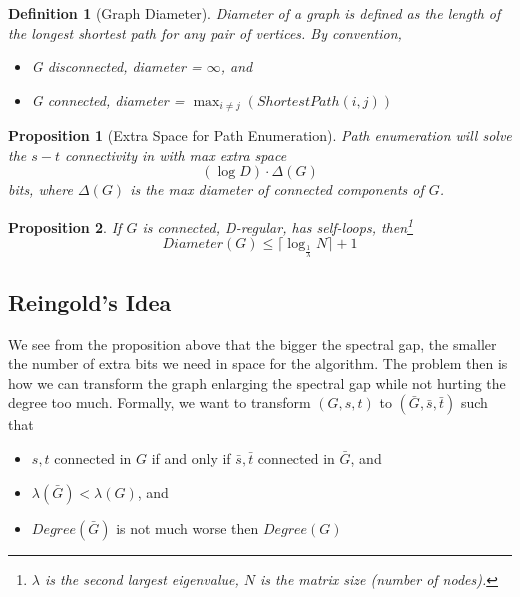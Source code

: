 \documentclass[11pt, letter]{book}
\newtheorem{proposition}{Proposition}[chapter]
\newtheorem{definition}{Definition}[chapter]
\begin{document}
\begin{definition}[Graph Diameter]
	Diameter of a graph is defined as the length of the longest shortest path for any pair of vertices. By convention, 
	\begin{itemize}
		\item G disconnected, diameter = $\infty$, and
		\item G connected, diameter = $\max_{i \neq j} \left( ShortestPath (i, j) \right)$
	\end{itemize}
\end{definition}

\begin{mdframed}
	\begin{proposition}[Extra Space for Path Enumeration]
		Path enumeration will solve the $s-t$ connectivity in with max extra space 
		\begin{equation}
			(\log D) \cdot \Delta (G) \label{eq:path_enumeration_extra_space}
		\end{equation} 
		bits, where $\Delta (G)$ is the max diameter of connected components of $G$. 
	\end{proposition}
\end{mdframed}

\begin{proposition}
	If $G$ is connected, D-regular, has self-loops, then\footnote{$\lambda$ is the second largest eigenvalue, $N$ is the matrix size (number of nodes).}
	\begin{equation}
		Diameter(G) \leq \lceil \log _{\frac{1}{\lambda}} N \rceil + 1
	\end{equation}
\end{proposition}


\subsection{Reingold's Idea}\label{reingold_algo}
We see from the proposition above that the bigger the spectral gap, the smaller the number of extra bits we need in space for the algorithm. The problem then is how we can transform the graph enlarging the spectral gap while not hurting the degree too much. Formally, we want to transform $(G, s, t)$ to $(\bar G, \bar s, \bar t)$ such that 
\begin{itemize}
	\item $s, t$ connected in $G$ if and only if $\bar s, \bar t$ connected in $\bar G$, and
	\item $\lambda (\bar G) < \lambda (G)$, and
	\item $Degree(\bar G)$ is not much worse then $Degree(G)$
\end{itemize}
\end{document}
